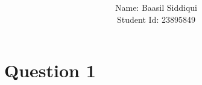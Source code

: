 \documentclass[11pt]{article}
\title{\textbf{}}
\author{Name: Baasil Siddiqui \\ Student Id: 23895849}
\date{}
\begin{document}
\parskip 2mm
\maketitle
\thispagestyle{empty}

\section*{Question 1}
\end{document}
